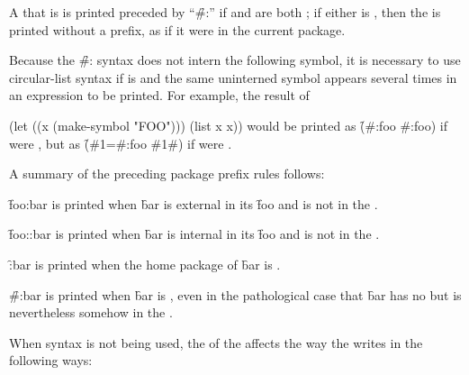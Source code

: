 A  that is  is printed
preceded by ``\f{\#:}'' if 
and  are both ;
if either is \nil, then the  is printed without
a prefix, as if it were in the current package.

Because the \f{\#:} syntax does not intern the
following symbol, it is necessary to use circular-list syntax
if  is  and
the same uninterned symbol appears several times in an expression
to be printed.  For example, the result of

\code
 (let ((x (make-symbol "FOO"))) (list x x))
\endcode
would be printed as \f{(\#:foo \#:foo)} if 
were , but as \f{(\#1=\#:foo \#1\#)} if 
were .

A summary of the preceding package prefix rules follows:

\beginlist
{}

\f{foo:bar} is printed when  \f{bar} 
is external in its  \f{foo} 
and is not  in the .
         

\f{foo::bar} is printed when \f{bar} is internal in its 
\f{foo} and is not  in the .
         

\f{:bar} is printed when the home package of \f{bar} is .
                

\f{\#:bar} is printed when \f{bar} is ,
even in the pathological case that \f{bar} 
has no  but is nevertheless somehow  
in the .
\endlist


\endsubsubsubsection%


When  syntax is not being used,
the  of the  
affects the way the  writes 
in the following ways:
 
